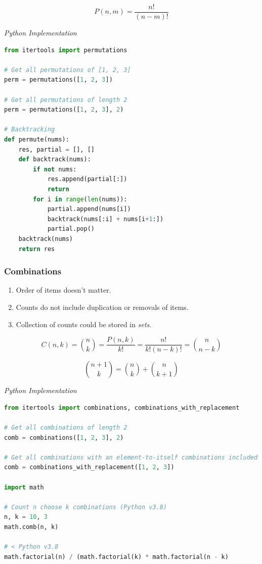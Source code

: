 \documentclass{article}
\begin{document}
    \[
    P(n,m) = \frac{n!}{(n-m)!}
    \]

    
\vspace{8pt} \emph{Python Implementation}
\begin{lstlisting}[language=Python]
from itertools import permutations 

# Get all permutations of [1, 2, 3] 
perm = permutations([1, 2, 3])   

# Get all permutations of length 2 
perm = permutations([1, 2, 3], 2)

# Backtracking
def permute(nums):
    res, partial = [], []
    def backtrack(nums):
        if not nums:
            res.append(partial[:])
            return
        for i in range(len(nums)):
            partial.append(nums[i])
            backtrack(nums[:i] + nums[i+1:])
            partial.pop()
    backtrack(nums)
    return res
\end{lstlisting} 

    \subsubsection{Combinations}
    \begin{enumerate}
        \item Order of items doesn't matter. 
        \item Counts do not include duplication or removals of items.
        \item Collection of counts could be stored in \emph{sets}.
    \end{enumerate}
    
    \[
       C(n, k) = \binom{n}{k} = \frac{P(n,k)}{k!} = \frac{n!}{k!(n-k)!} = \binom{n}{n-k}
    \]
    
    \[
        \binom{n+1}{k} = \binom{n}{k} + \binom{n}{k+1}
    \]

\vspace{8pt} \emph{Python Implementation}
\begin{lstlisting}[language=Python]
from itertools import combinations, combinations_with_replacement

# Get all combinations of length 2 
comb = combinations([1, 2, 3], 2)

# Get all combinations with an element-to-itself combinations included 
comb = combinations_with_replacement([1, 2, 3])

import math

# Count n choose k combinations (Python v3.8)
n, k = 10, 3
math.comb(n, k)

# < Python v3.8
math.factorial(n) / (math.factorial(k) * math.factorial(n - k)

\end{lstlisting}
\end{document}
